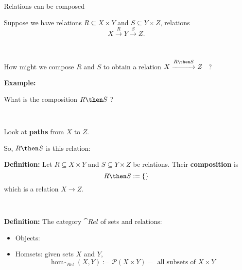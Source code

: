 \begin{frame}[fragile]{Relations can be composed}

Suppose we have relations $R \subseteq X \times Y$ and $S \subseteq Y \times Z$,  relations
$$
X \overset{R}{\longrightarrow} Y \overset{S}{\longrightarrow} Z.
$$

\

How might we compose $R$ and $S$ to obtain a relation $X \overset{R \then S}{\xrightarrow{\hspace*{1cm}}} Z$ \ ?

\vfill \vfill \vfill \vfill \vfill \vfill \vfill \vfill 

\end{frame}



\begin{frame}[fragile]

\textbf{Example:} 


\vfill \vfill \vfill \vfill \vfill \vfill 

What is the composition $R \then S$ ? 

\

Look at \textbf{paths} from $X$ to $Z$. 
\end{frame}




\begin{frame}[fragile]

\vfill \vfill \vfill \vfill \vfill \vfill 

So, $R \then S$ is this relation:

\vfill \vfill \vfill \vfill \vfill \vfill 

\end{frame}





\begin{frame}[fragile]

\textbf{Definition:}  Let $R \subseteq X \times Y$ and $S \subseteq Y \times Z$ be relations. Their \textbf{composition} is
$$
R \then S := \{ \}
$$
which is a relation $X \rightarrow Z$. 

\

\textbf{Definition:} The category $\cat{Rel}$ of sets and relations:
\begin{itemize}
\item Objects: 
\item Homsets: given sets $X$ and $Y$, 
$$
\hom_{\cat{Rel}}(X,Y) := \mathcal{P}(X \times Y) = \text{ all subsets of $X \times Y$}
$$
\end{itemize}


\vfill \vfill \vfill \vfill \vfill \vfill 
\end{frame}






